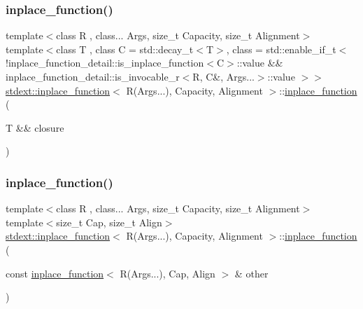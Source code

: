 \subsubsection{\texorpdfstring{inplace\+\_\+function()}{inplace\_function()}\hspace{0.1cm}{\footnotesize\ttfamily [2/14]}}
{\footnotesize\ttfamily template$<$class R , class... Args, size\+\_\+t Capacity, size\+\_\+t Alignment$>$ \\
template$<$class T , class C  = std\+::decay\+\_\+t$<$\+T$>$, class  = std\+::enable\+\_\+if\+\_\+t$<$            !inplace\+\_\+function\+\_\+detail\+::is\+\_\+inplace\+\_\+function$<$\+C$>$\+::value            \&\& inplace\+\_\+function\+\_\+detail\+::is\+\_\+invocable\+\_\+r$<$\+R, C\&, Args...$>$\+::value        $>$$>$ \\
\hyperlink{classstdext_1_1inplace__function}{stdext\+::inplace\+\_\+function}$<$ R(Args...), Capacity, Alignment $>$\+::\hyperlink{classstdext_1_1inplace__function}{inplace\+\_\+function} (\begin{DoxyParamCaption}\item[{T \&\&}]{closure }\end{DoxyParamCaption})\hspace{0.3cm}{\ttfamily [inline]}}

\mbox{\label{classstdext_1_1inplace__function_3_01R_07Args_8_8_8_08_00_01Capacity_00_01Alignment_01_4_adc64caf861ce3703357c901c4691ace7}} 
\subsubsection{\texorpdfstring{inplace\+\_\+function()}{inplace\_function()}\hspace{0.1cm}{\footnotesize\ttfamily [3/14]}}
{\footnotesize\ttfamily template$<$class R , class... Args, size\+\_\+t Capacity, size\+\_\+t Alignment$>$ \\
template$<$size\+\_\+t Cap, size\+\_\+t Align$>$ \\
\hyperlink{classstdext_1_1inplace__function}{stdext\+::inplace\+\_\+function}$<$ R(Args...), Capacity, Alignment $>$\+::\hyperlink{classstdext_1_1inplace__function}{inplace\+\_\+function} (\begin{DoxyParamCaption}\item[{const \hyperlink{classstdext_1_1inplace__function}{inplace\+\_\+function}$<$ R(Args...), Cap, Align $>$ \&}]{other }\end{DoxyParamCaption})\hspace{0.3cm}{\ttfamily [inline]}}


